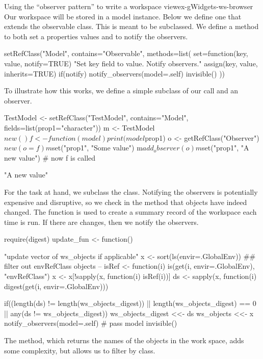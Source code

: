 \begin{example}{Using the ``observer pattern'' to write a workspace view}{ex-gWidgets-ws-browser}
Our workspace will be stored in a model instance. Below we define one
that extends the observable class. This is meant to be subclassed. We
define a  method to both set a properties values and to
notify the observers. 
\begin{Schunk}
\begin{Sinput}
 setRefClass("Model",
       contains="Observable",
       methods=list(
         set=function(key, value, notify=TRUE) {
           "Set key field to value. Notify observers."
           assign(key, value, inherits=TRUE)
           if(notify)
             notify_observers(model=.self)
           invisible()
         }))
\end{Sinput}
\end{Schunk}
%



To illustrate how this works, we define a simple subclass of our
 call and an observer.
\begin{Schunk}
\begin{Sinput}
 TestModel <- setRefClass("TestModel",
                          contains="Model",
                          fields=list(prop1="character"))
 m <- TestModel$new()
 f <- function(model) print(model$prop1)
 o <- getRefClass("Observer")$new(o=f)
 m$set("prop1", "Some value")
 m$add_observer(o)
 m$set("prop1", "A new value")           # now f is called
\end{Sinput}
\begin{Soutput}
[1] "A new value"
\end{Soutput}
\end{Schunk}

For the task at hand, we subclass the  class. Notifying
the observers is potentially expensive and disruptive, so we check in
the  method that objects have indeed changed. The
 function is used to create a summary record of the
workspace each time  is run. If there are changes, then
we notify the observers. 
\begin{Schunk}
\begin{Sinput}
 require(digest)
 update_fun <- function() {
   "update vector of ws_objects if applicable"
   x <- sort(ls(envir=.GlobalEnv))
   ## filter out envRefClass objects --
   isRef <- function(i) 
     is(get(i, envir=.GlobalEnv), "envRefClass")
   x <- x[!sapply(x, function(i) isRef(i))]
   ds <- sapply(x, function(i) 
                digest(get(i, envir=.GlobalEnv)))
   
   if((length(ds) != length(ws_objects_digest)) ||
      length(ws_objects_digest) == 0 ||
      any(ds != ws_objects_digest)) {
     ws_objects_digest <<- ds 
     ws_objects <<- x
     notify_observers(model=.self) # pass model
   }
   invisible()
 }
\end{Sinput}
\end{Schunk}
%
The  method, which returns the names of the
objects in the work space,  adds some complexity, but allows us to
filter by class.


\end{example}
